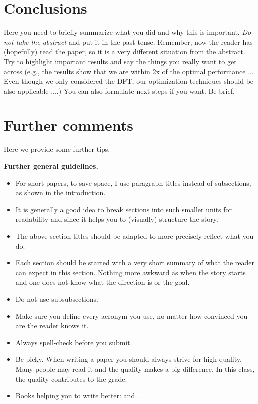 \documentclass[letterpaper]{article}
\newcommand{\mypar}[1]{{\bf #1.}}
\begin{document}
\section{Conclusions}

Here you need to briefly summarize what you did and why this is
important. {\em Do not take the abstract} and put it in the past
tense. Remember, now the reader has (hopefully) read the paper, so it
is a very different situation from the abstract. Try to highlight
important results and say the things you really want to get across
(e.g., the results show that we are within 2x of the optimal performance ...
Even though we only considered the DFT, our optimization
techniques should be also applicable ....) You can also formulate next
steps if you want. Be brief.

\section{Further comments}

Here we provide some further tips.

\mypar{Further general guidelines}

\begin{itemize}
\item For short papers, to save space, I use paragraph titles instead of
subsections, as shown in the introduction.

\item It is generally a good idea to break sections into such smaller
units for readability and since it helps you to (visually) structure the story.

\item The above section titles should be adapted to more precisely
reflect what you do.

\item Each section should be started with a very
short summary of what the reader can expect in this section. Nothing
more awkward as when the story starts and one does not know what the
direction is or the goal.

\item Do not use subsubsections.

\item Make sure you define every acronym you use, no matter how
convinced you are the reader knows it.

\item Always spell-check before you submit.

\item Be picky. When writing a paper you should always strive for 
high quality. Many people may read it and the quality makes a big difference.
In this class, the quality contributes to the grade.

\item Books helping you to write better: \cite{Higham:98} and \cite{Strunk:00}.
\end{itemize}
\end{document}
